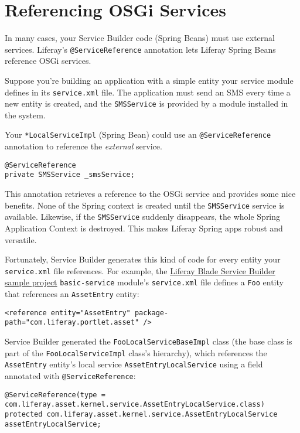 \section{Referencing OSGi Services}\label{referencing-osgi-services}

In many cases, your Service Builder code (Spring Beans) must use
external services. Liferay's \texttt{@ServiceReference} annotation lets
Liferay Spring Beans reference OSGi services.

Suppose you're building an application with a simple entity your service
module defines in its \texttt{service.xml} file. The application must
send an SMS every time a new entity is created, and the
\texttt{SMSService} is provided by a module installed in the system.

Your \texttt{*LocalServiceImpl} (Spring Bean) could use an
\texttt{@ServiceReference} annotation to reference the \emph{external}
service.

\begin{verbatim}
@ServiceReference
private SMSService _smsService;
\end{verbatim}

This annotation retrieves a reference to the OSGi service and provides
some nice benefits. None of the Spring context is created until the
\texttt{SMSService} service is available. Likewise, if the
\texttt{SMSService} suddenly disappears, the whole Spring Application
Context is destroyed. This makes Liferay Spring apps robust and
versatile.

Fortunately, Service Builder generates this kind of code for every
entity your \texttt{service.xml} file references. For example, the
\href{/docs/7-2/reference/-/knowledge_base/r/service-builder-samples}{Liferay
Blade Service Builder sample project} \texttt{basic-service} module's
\texttt{service.xml} file defines a \texttt{Foo} entity that references
an \texttt{AssetEntry} entity:

\begin{verbatim}
<reference entity="AssetEntry" package-path="com.liferay.portlet.asset" />
\end{verbatim}

Service Builder generated the \texttt{FooLocalServiceBaseImpl} class
(the base class is part of the \texttt{FooLocalServiceImpl} class's
hierarchy), which references the \texttt{AssetEntry} entity's local
service \texttt{AssetEntryLocalService} using a field annotated with
\texttt{@ServiceReference}:

\begin{verbatim}
@ServiceReference(type = com.liferay.asset.kernel.service.AssetEntryLocalService.class)
protected com.liferay.asset.kernel.service.AssetEntryLocalService assetEntryLocalService;
\end{verbatim}

